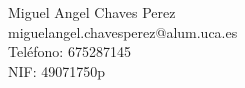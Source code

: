 Miguel Angel Chaves Perez \\ %
miguelangel.chavesperez@alum.uca.es \\ %
Teléfono: 675287145 \\ %
NIF: 49071750p \\ %
